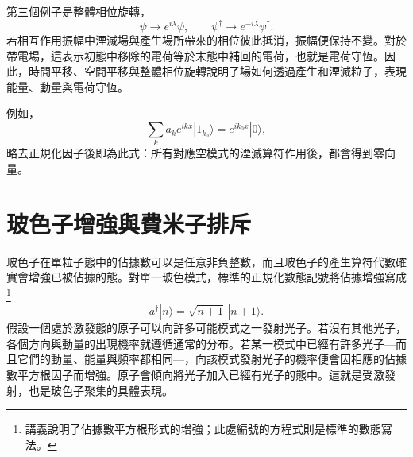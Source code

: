 第三個例子是整體相位旋轉，
\begin{equation}
\psi\longrightarrow e^{i\lambda}\psi,
\qquad
\psi^\dagger\longrightarrow e^{-i\lambda}\psi^\dagger.
\end{equation}
若相互作用振幅中湮滅場與產生場所帶來的相位彼此抵消，振幅便保持不變。對於帶電場，這表示初態中移除的電荷等於末態中補回的電荷，也就是電荷守恆。因此，時間平移、空間平移與整體相位旋轉說明了場如何透過產生和湮滅粒子，表現能量、動量與電荷守恆。

\begin{classroomqa}
\end{classroomqa}

\begin{classroomqa}
\end{classroomqa}

\begin{classroomqa}
\end{classroomqa}

例如，
\begin{equation}
\sum_k a_k e^{ikx}|1_{k_0}\rangle
=e^{ik_0x}|0\rangle,
\end{equation}
略去正規化因子後即為此式：所有對應空模式的湮滅算符作用後，都會得到零向量。

\section{玻色子增強與費米子排斥}

玻色子在單粒子態中的佔據數可以是任意非負整數，而且玻色子的產生算符代數確實會增強已被佔據的態。對單一玻色模式，標準的正規化數態記號將佔據增強寫成\footnote{講義說明了佔據數平方根形式的增強；此處編號的方程式則是標準的數態寫法。}
\begin{equation}
a^\dagger|n\rangle=\sqrt{n+1}\,|n+1\rangle.
\end{equation}
假設一個處於激發態的原子可以向許多可能模式之一發射光子。若沒有其他光子，各個方向與動量的出現機率就遵循通常的分布。若某一模式中已經有許多光子---而且它們的動量、能量與頻率都相同---，向該模式發射光子的機率便會因相應的佔據數平方根因子而增強。原子會傾向將光子加入已經有光子的態中。這就是受激發射，也是玻色子聚集的具體表現。

